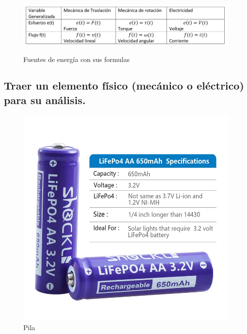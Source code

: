 \begin{figure}[H]
	\centering
	\caption{Fuentes de energía con sus formulas}
	\includegraphics[width=0.7\linewidth]{img/tabla4}
	\label{fig:tabla4}
\end{figure}


\subsection{Traer un elemento físico (mecánico o eléctrico) para su análisis.}

\begin{figure}[H]
	\centering
	\includegraphics[width=0.5\linewidth]{img/Pila}
	\caption{Pila}
	\label{fig:pila}
\end{figure}


